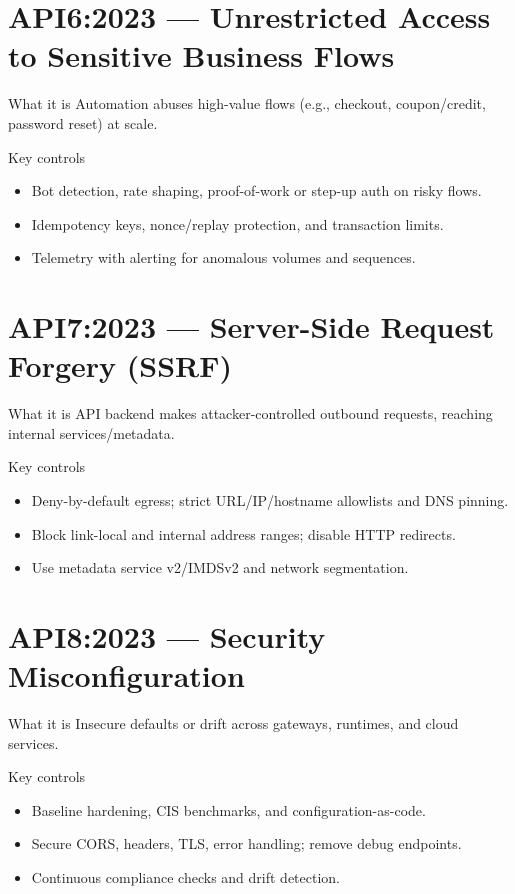 \documentclass[11pt,a4paper]{article}
\begin{document}
\section{API6:2023 — Unrestricted Access to Sensitive Business Flows}
\begin{callout}{What it is}
Automation abuses high\mbox{-}value flows (e.g., checkout, coupon/credit, password reset) at scale.
\end{callout}
\begin{callout}{Key controls}
\begin{itemize}
  \item Bot detection, rate shaping, proof\mbox{-}of\mbox{-}work or step\mbox{-}up auth on risky flows.
  \item Idempotency keys, nonce/replay protection, and transaction limits.
  \item Telemetry with alerting for anomalous volumes and sequences.
\end{itemize}
\end{callout}

\section{API7:2023 — Server-Side Request Forgery (SSRF)}
\begin{callout}{What it is}
API backend makes attacker\mbox{-}controlled outbound requests, reaching internal services/metadata.
\end{callout}
\begin{callout}{Key controls}
\begin{itemize}
  \item Deny\mbox{-}by\mbox{-}default egress; strict URL/IP/hostname allowlists and DNS pinning.
  \item Block link\mbox{-}local and internal address ranges; disable HTTP redirects.
  \item Use metadata service v2/IMDSv2 and network segmentation.
\end{itemize}
\end{callout}

\section{API8:2023 — Security Misconfiguration}
\begin{callout}{What it is}
Insecure defaults or drift across gateways, runtimes, and cloud services.
\end{callout}
\begin{callout}{Key controls}
\begin{itemize}
  \item Baseline hardening, CIS benchmarks, and configuration\mbox{-}as\mbox{-}code.
  \item Secure CORS, headers, TLS, error handling; remove debug endpoints.
  \item Continuous compliance checks and drift detection.
\end{itemize}
\end{callout}
\end{document}
